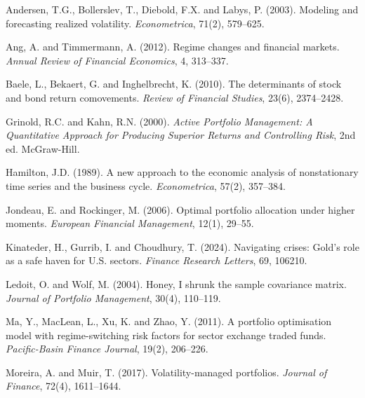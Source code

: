 \documentclass[11pt, a4paper]{article}
\newcommand{\new}[1]{#1}
\newcommand{\reftgt}[1]{\hypertarget{ref:#1}{}}
\begin{document}
\begin{description}[leftmargin=2em, itemsep=2pt]

\new{\item \reftgt{andersen2003} Andersen, T.G., Bollerslev, T., Diebold, F.X. and Labys, P. (2003). Modeling and
  forecasting realized volatility. \textit{Econometrica}, 71(2), 579--625.}

\item \reftgt{angtimm2012} Ang, A. and Timmermann, A. (2012). Regime changes and financial markets.
  \textit{Annual Review of Financial Economics}, 4, 313--337.


\new{\item \reftgt{baele2010} Baele, L., Bekaert, G. and Inghelbrecht, K. (2010). The determinants of stock and
  bond return comovements. \textit{Review of Financial Studies}, 23(6), 2374--2428.}

\new{\item \reftgt{grinold2000} Grinold, R.C. and Kahn, R.N. (2000). \textit{Active Portfolio Management: A
  Quantitative Approach for Producing Superior Returns and Controlling Risk}, 2nd ed.
  McGraw-Hill.}

\item \reftgt{hamilton1989} Hamilton, J.D. (1989). A new approach to the economic analysis of nonstationary time
  series and the business cycle. \textit{Econometrica}, 57(2), 357--384.

\item \reftgt{jondeau2006} Jondeau, E. and Rockinger, M. (2006). Optimal portfolio allocation under higher
  moments. \textit{European Financial Management}, 12(1), 29--55.

\item \reftgt{kinateder2024} Kinateder, H., Gurrib, I. and Choudhury, T. (2024). Navigating crises: Gold's role as a safe haven for U.S. sectors. \textit{Finance Research Letters}, 69, 106210.

\new{\item \reftgt{ledoit2004} Ledoit, O. and Wolf, M. (2004). Honey, I shrunk the sample covariance matrix.
  \textit{Journal of Portfolio Management}, 30(4), 110--119.}

\item \reftgt{ma2011}Ma, Y., MacLean, L., Xu, K. and Zhao, Y. (2011). A portfolio optimisation model with
  regime-switching risk factors for sector exchange traded funds.
  \textit{Pacific-Basin Finance Journal}, 19(2), 206--226.


\new{\item \reftgt{moreira2017} Moreira, A. and Muir, T. (2017). Volatility-managed portfolios.
  \textit{Journal of Finance}, 72(4), 1611--1644.}


\end{description}
\end{document}
